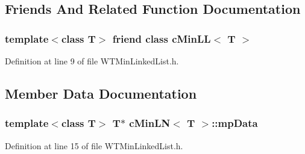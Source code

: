 \subsection{Friends And Related Function Documentation}
\hypertarget{classc_min_l_n_afe8a889f8a2d6d0d7ff40bcf4dcbc024}{
\subsubsection[{cMinLL$<$ T $>$}]{\setlength{\rightskip}{0pt plus 5cm}template$<$class T$>$ friend class {\bf cMinLL}$<$ T $>$}}
\label{classc_min_l_n_afe8a889f8a2d6d0d7ff40bcf4dcbc024}


Definition at line 9 of file WTMinLinkedList.h.



\subsection{Member Data Documentation}
\hypertarget{classc_min_l_n_a59b83cefc712458b2200a6560711c8c1}{
\subsubsection[{mpData}]{\setlength{\rightskip}{0pt plus 5cm}template$<$class T$>$ T$\ast$ {\bf cMinLN}$<$ T $>$::{\bf mpData}}}
\label{classc_min_l_n_a59b83cefc712458b2200a6560711c8c1}


Definition at line 15 of file WTMinLinkedList.h.

